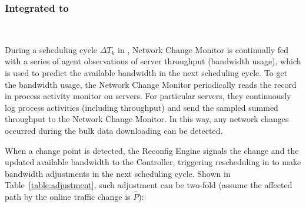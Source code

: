 {%

\subsubsection{Integrated to \name}
\

During a scheduling cycle $\Delta T_k$ in \name, Network Change Monitor is continually fed with a series of agent observations of server throughput (bandwidth usage), which is used to predict the available bandwidth in the next scheduling cycle. To get the bandwidth usage, the Network Change Monitor periodically reads the record in process activity monitor on servers. For particular servers, they continuously log process activities (including throughput) and send the sampled summed throughput to the Network Change Monitor. In this way, any network changes occurred during the bulk data downloading can be detected.


 When a change point is detected, the Reconfig Engine signals the change and the updated available bandwidth to the Controller, triggering rescheduling in \newname to make bandwidth adjustments in the next scheduling cycle. Shown in Table~\ref{table:adjustment}, such adjustment can be two-fold (assume the affected path by the online traffic change is $\hat{P}$):

\begin{table}[t]
\begin{center}
\end{center}
\caption{}
\label{table:adjustment}
\end{table}

}
